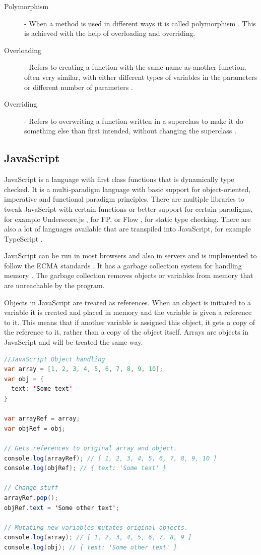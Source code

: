 \documentclass {article}
\begin{document}
\begin{description}
\item [Polymorphism] - When a method is used in different ways it is called polymorphism \cite{gabmar, skansholm}. This is achieved with the help of overloading and overriding.
 
\item[Overloading] - Refers to creating a function with the same name as another function, often very similar, with either different types of variables in the parameters or different number of parameters \cite{skansholm}.
 
\item[Overriding] - Refers to overwriting a function written in a superclass to make it do something else than first intended, without changing the superclass \cite{skansholm}.
\end{description}
\subsection{JavaScript}
\label{sec:javascript}
JavaScript is a language with first class functions that is dynamically type checked. It is a multi-paradigm language with basic support for object-oriented, imperative and functional paradigm principles. There are multiple libraries to tweak JavaScript with certain functions or better support for certain paradigms, for example Underscore.js \cite{underscorejs}, for FP, or Flow \cite{flow}, for static type checking. There are also a lot of languages available that are transpiled into JavaScript, for example TypeScript \cite{typescript}. 
 
JavaScript can be run in most browsers and also in servers and is implemented to follow the ECMA standards \cite{ecma6table}. It has a garbage collection system for handling memory \cite{mozillamem}. The garbage collection removes objects or variables from memory that are unreachable by the program. 
 
Objects in JavaScript are treated as references. When an object is initiated to a variable it is created and placed in memory and the variable is given a reference to it. This means that if another variable is assigned this object, it gets a copy of the reference to it, rather than a copy of the object itself. Arrays are objects in JavaScript and will be treated the same way.
 
\begin{lstlisting}[language=Java, breaklines=true]
//JavaScript Object handling
var array = [1, 2, 3, 4, 5, 6, 7, 8, 9, 10];
var obj = {
  text: 'Some text'
}
 
var arrayRef = array;
var objRef = obj;
 
// Gets references to original array and object.
console.log(arrayRef); // [ 1, 2, 3, 4, 5, 6, 7, 8, 9, 10 ]
console.log(objRef); // { text: 'Some text' }
 
// Change stuff
arrayRef.pop();
objRef.text = 'Some other text';
 
// Mutating new variables mutates original objects.
console.log(array); // [ 1, 2, 3, 4, 5, 6, 7, 8, 9 ]
console.log(obj); // { text: 'Some other text' }
\end{lstlisting}
\end{document}
